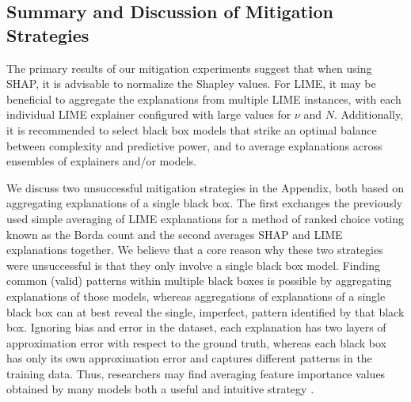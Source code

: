 \documentclass[mnsc,blindrev]{informs3}
\begin{document}
    \subsection{Summary and Discussion of Mitigation Strategies}
            \label{sec:summary_and_strategies}
            The primary results of our mitigation experiments suggest that when using SHAP, it is advisable to normalize the Shapley values. For LIME, it may be beneficial to aggregate the explanations from multiple LIME instances, with each individual LIME explainer configured with large values for $\nu$ and $N$. Additionally, it is recommended to select black box models that strike an optimal balance between complexity and predictive power, and to average explanations across ensembles of explainers and/or models.

            We discuss two unsuccessful mitigation strategies in the Appendix, both based on aggregating explanations of a single black box. The first exchanges the previously used simple averaging of LIME explanations for a method of ranked choice voting known as the Borda count and the second averages SHAP and LIME explanations together. We believe that a core reason why these two strategies were unsuccessful is that they only involve a single black box model. Finding common (valid) patterns within multiple black boxes is possible by aggregating explanations of those models, whereas aggregations of explanations of a single black box can at best reveal the single, imperfect, pattern identified by that black box. Ignoring bias and error in the dataset, each explanation has two layers of approximation error with respect to the ground truth, whereas each black box has only its own approximation error and captures different patterns in the training data. Thus, researchers may find averaging feature importance values obtained by many models both a useful and intuitive strategy \citep{dong2020variable,donnelly2023rashomon}.  %
            
\end{document}
